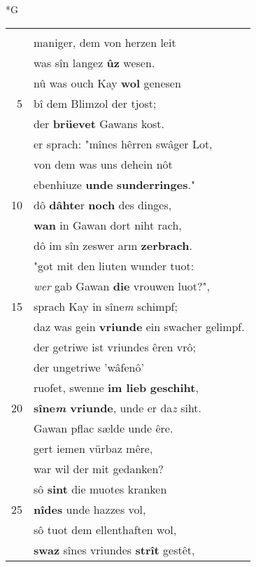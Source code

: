 \documentclass[8pt,a4paper,notitlepage]{article}
\begin{document}
\newpage
\begin{table}[ht]
\begin{minipage}[t]{0.5\linewidth}
\small
\begin{center}*G
\end{center}
\begin{tabular}{rl}
 & \textbf{\begin{large}A\end{large}n sîne} herberge reit\\ 
 & maniger, dem von herzen leit\\ 
 & was sîn langez \textbf{ûz} wesen.\\ 
 & nû was ouch Kay \textbf{wol} genesen\\ 
5 & bî dem Blimzol der tjost;\\ 
 & der \textbf{brüevet} Gawans kost.\\ 
 & er sprach: "mînes hêrren swâger Lot,\\ 
 & von dem was uns dehein nôt\\ 
 & ebenhiuze \textbf{unde} \textbf{sunderringes}."\\ 
10 & dô \textbf{dâhte}r \textbf{noch} des dinges,\\ 
 & \textbf{wan} in Gawan dort niht rach,\\ 
 & dô im sîn zeswer arm \textbf{zerbrach}.\\ 
 & "got mit den liuten wunder tuot:\\ 
 & \textit{wer} gab Gawan \textbf{die} vrouwen luot?",\\ 
15 & sprach Kay in sîne\textit{m} schimpf;\\ 
 & daz was gein \textbf{vriunde} ein swacher gelimpf.\\ 
 & der getriwe ist vriundes êren vrô;\\ 
 & der ungetriwe 'wâfenô'\\ 
 & ruofet, swenne \textbf{im lieb} \textbf{geschiht},\\ 
20 & \textbf{sîne\textit{m} vriunde}, unde er da\textit{z} siht.\\ 
 & Gawan pflac sælde unde êre.\\ 
 & gert iemen vürbaz mêre,\\ 
 & war wil der mit gedanken?\\ 
 & sô \textbf{sint} die muotes kranken\\ 
25 & \textbf{nîdes} unde hazzes vol,\\ 
 & sô tuot dem ellenthaften wol,\\ 
 & \textbf{swaz} sînes vriundes \textbf{strît} gestêt,\\ 

\end{tabular}
\end{minipage}
\end{table}
\end{document}
